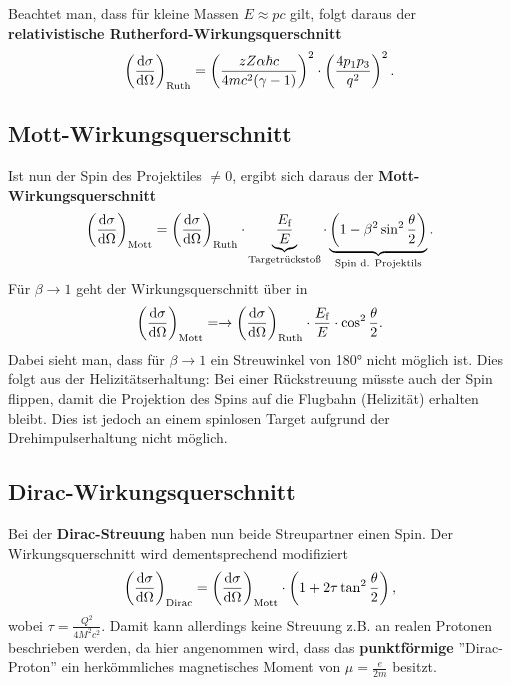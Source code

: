 Beachtet man, dass für kleine Massen $E\approx pc$ gilt, folgt daraus der \textbf{relativistische Rutherford-Wirkungsquerschnitt}
\begin{equation*}
	\left(\diff[\sigma]{\Omega}\right)_\text{Ruth} = \left(\frac{zZ\alpha\hbar c}{4mc^2(\gamma-1)}\right)^2\cdot\left(\frac{4p_1p_3}{q^2}\right)^2.
\end{equation*}

\subsection{Mott-Wirkungsquerschnitt}
Ist nun der Spin des Projektiles $\neq 0$, ergibt sich daraus der \textbf{Mott-Wirkungsquerschnitt}
\begin{equation*}
	\left(\diff[\sigma]{\Omega}\right)_\text{Mott} = \left(\diff[\sigma]{\Omega}\right)_\text{Ruth}\cdot\underbrace{\frac{E_\text{f}}{E}}_\text{Targetrückstoß}\cdot\underbrace{\left(1-\beta^2\sin^2\frac{\theta}{2}\right)}_\text{Spin d. Projektils}.
\end{equation*}
Für $\beta\rightarrow 1$ geht der Wirkungsquerschnitt über in
\begin{equation*}
	\left(\diff[\sigma]{\Omega}\right)_\text{Mott}= \rightarrow\left(\diff[\sigma]{\Omega}\right)_\text{Ruth}\cdot\frac{E_\text{f}}{E}\cdot\cos^2\frac{\theta}{2}.
\end{equation*}
Dabei sieht man, dass für $\beta\rightarrow 1$ ein Streuwinkel von 180° nicht möglich ist.
Dies folgt aus der Helizitätserhaltung: Bei einer Rückstreuung müsste auch der Spin flippen, damit die Projektion des Spins auf die Flugbahn (Helizität) erhalten bleibt. Dies ist jedoch an einem spinlosen Target aufgrund der Drehimpulserhaltung nicht möglich.

\subsection{Dirac-Wirkungsquerschnitt}
Bei der \textbf{Dirac-Streuung} haben nun beide Streupartner einen Spin.
Der Wirkungsquerschnitt wird dementsprechend modifiziert
\begin{equation*}
	\left(\diff[\sigma]{\Omega}\right)_\text{Dirac} = \left(\diff[\sigma]{\Omega}\right)_\text{Mott}\cdot\left(1+2\tau\tan^2\frac{\theta}{2}\right),
\end{equation*}
wobei $\tau = \frac{Q^2}{4M^2c^2}$.
Damit kann allerdings keine Streuung z.B. an realen Protonen beschrieben werden, da hier angenommen wird, dass das \textbf{punktförmige} ''Dirac-Proton'' ein herkömmliches magnetisches Moment von $\mu=\frac{e}{2m}$ besitzt.

